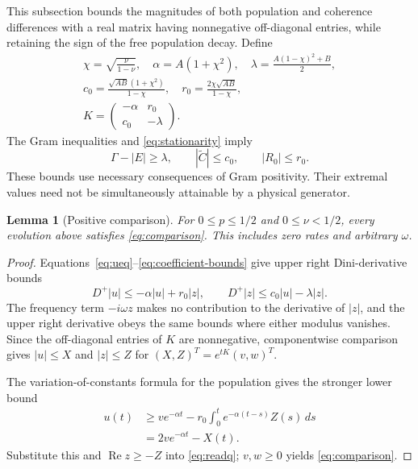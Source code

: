\documentclass[aps,pra,reprint,amsmath,amssymb,nofootinbib,floatfix,longbibliography]{revtex4-2}
\theoremstyle{aps}
\newtheorem{lemma}[theorem]{Lemma}
\begin{document}
This subsection bounds the magnitudes of both population and coherence differences with a real matrix having nonnegative off-diagonal entries, while retaining the sign of the free population decay. Define
\begin{equation}\label{eq:comparison-coeff}
 \begin{gathered}
 \chi=\sqrt{\frac\nu{1-\nu}},\quad \alpha=A(1+\chi^2),\quad
 \lambda=\frac{A(1-\chi)^2+B}{2},\\
 c_0=\frac{\sqrt{AB}(1+\chi^2)}{1-\chi},\quad
 r_0=\frac{2\chi\sqrt{AB}}{1-\chi},\\
 K=\begin{pmatrix}-\alpha&r_0\\c_0&-\lambda\end{pmatrix}.
 \end{gathered}
\end{equation}
The Gram inequalities and \eqref{eq:stationarity} imply
\begin{equation}\label{eq:coefficient-bounds}
 \Gamma-|E|\ge\lambda,\qquad
 |\widetilde C|\le c_0,\qquad |R_0|\le r_0.
\end{equation}
These bounds use necessary consequences of Gram positivity. Their extremal values need not be simultaneously attainable by a physical generator.

\begin{lemma}[Positive comparison]\label{lem:comparison}
For $0\le p\le1/2$ and $0\le\nu<1/2$, every evolution above satisfies \eqref{eq:comparison}.
This includes zero rates and arbitrary $\omega$.
\end{lemma}

\begin{proof}
Equations~\eqref{eq:ueq}--\eqref{eq:coefficient-bounds} give upper right Dini-derivative bounds
\[
 D^+|u|\le-\alpha|u|+r_0|z|,\qquad
 D^+|z|\le c_0|u|-\lambda|z|.
\]
The frequency term $-i\omega z$ makes no contribution to the derivative of $|z|$, and the upper right derivative obeys the same bounds where either modulus vanishes. Since the off-diagonal entries of $K$ are nonnegative, componentwise comparison gives $|u|\le X$ and $|z|\le Z$ for $(X,Z)^T=e^{tK}(v,w)^T$.

The variation-of-constants formula for the population gives the stronger lower bound
\begin{align*}
 u(t)&\ge ve^{-\alpha t}-r_0\int_0^t e^{-\alpha(t-s)}Z(s)\,ds\\
 &=2ve^{-\alpha t}-X(t).
\end{align*}
Substitute this and $\operatorname{Re}z\ge-Z$ into \eqref{eq:readq}; $v,w\ge0$ yields \eqref{eq:comparison}.
\end{proof}
\end{document}
